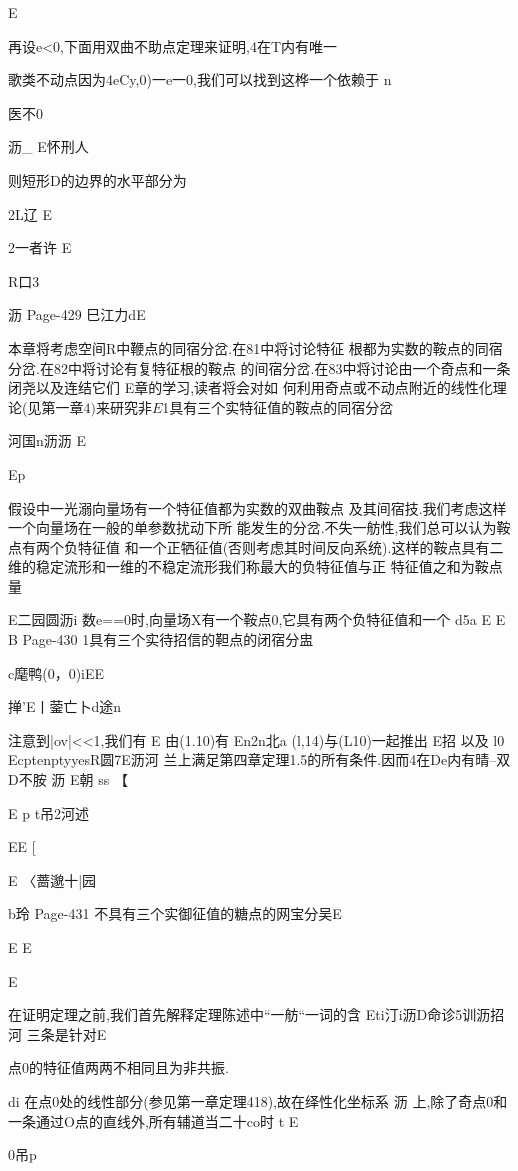 {{{{{{{E

再设e<0,下面用双曲不助点定理来证明,4在T内有唯一

歌类不动点因为4eCy,0)一e一0,我们可以找到这桦一个依赖于
n

医不0

沥_
E怀刑人

则短形D的边界的水平部分为

2L辽
E

2一者许
E

R口3

沥
Page-429
巳江力dE

本章将考虑空间R中鞭点的同宿分岔.在81中将讨论特征
根都为实数的鞍点的同宿分岔.在82中将讨论有复特征根的鞍点
的间宿分岔.在83中将讨论由一个奇点和一条闭尧以及连结它们
E章的学习,读者将会对如
何利用奇点或不动点附近的线性化理论(见第一章$4)来研究非
E

$1具有三个实特征值的鞍点的同宿分岔

河国n沥沥
E

Ep

假设中一光溺向量场有一个特征值都为实数的双曲鞍点
及其间宿技.我们考虑这样一个向量场在一般的单参数扰动下所
能发生的分岔.不失一舫性,我们总可以认为鞍点有两个负特征值
和一个正牺征值(否则考虑其时间反向系统).这样的鞍点具有二
维的稳定流形和一维的不稳定流形我们称最大的负特征值与正
特征值之和为鞍点量

E二园圆沥i
数e==0时,向量场X有一个鞍点0,它具有两个负特征值和一个
d5a
E
E
B
Page-430
1具有三个实待招信的靼点的闭宿分盅

c麾鸭(0，0)iEE

掸'E丨蓥亡卜d途n

注意到|ov|<<1,我们有
E
由(1.10)有
En2n北a
(l,14)与(L10)一起推出
E招
以及
l0
EcptenptyyesR圆7E沥河
兰上满足第四章定理1.5的所有条件.因而4在De内有晴--双
D不胺
沥
E朝
ss
【

E
p
t吊2河述

EE
[

E
〈蔷邈十|园

b玲
Page-431
不具有三个实御征值的糖点的网宝分吴E

E
E

E

在证明定理之前,我们首先解释定理陈述中“一舫“一词的含
Eti汀i沥D命诊5训沥招河
三条是针对E

点0的特征值两两不相同且为非共振.

di
在点0处的线性部分(参见第一章定理418),故在绎性化坐标系
沥
上,除了奇点0和一条通过O点的直线外,所有辅道当二十co时
t
E

0吊p

}}}}}}}

